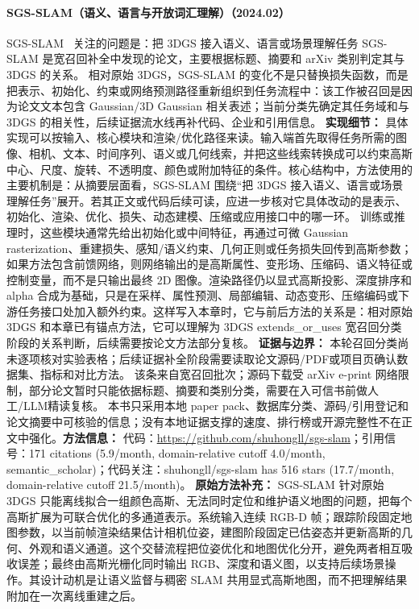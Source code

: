 \paragraph{SGS-SLAM（语义、语言与开放词汇理解）（2024.02）}
SGS-SLAM~\cite{2402_03246} 关注的问题是：把 3DGS 接入语义、语言或场景理解任务 SGS-SLAM 是宽召回补全中发现的论文，主要根据标题、摘要和 arXiv 类别判定其与 3DGS 的关系。
相对原始 3DGS，SGS-SLAM 的变化不是只替换损失函数，而是把表示、初始化、约束或网络预测路径重新组织到任务流程中：该工作被召回是因为论文文本包含 Gaussian/3D Gaussian 相关表述；当前分类先确定其任务域和与 3DGS 的相关性，后续证据流水线再补代码、企业和引用信息。
\textbf{实现细节：} 具体实现可以按输入、核心模块和渲染/优化路径来读。输入端首先取得任务所需的图像、相机、文本、时间序列、语义或几何线索，并把这些线索转换成可以约束高斯中心、尺度、旋转、不透明度、颜色或附加特征的条件。核心结构中，方法使用的主要机制是：从摘要层面看，SGS-SLAM 围绕“把 3DGS 接入语义、语言或场景理解任务”展开。若其正文或代码后续可读，应进一步核对它具体改动的是表示、初始化、渲染、优化、损失、动态建模、压缩或应用接口中的哪一环。 训练或推理时，这些模块通常先给出初始化或中间特征，再通过可微 Gaussian rasterization、重建损失、感知/语义约束、几何正则或任务损失回传到高斯参数；如果方法包含前馈网络，则网络输出的是高斯属性、变形场、压缩码、语义特征或控制变量，而不是只输出最终 2D 图像。渲染路径仍以显式高斯投影、深度排序和 alpha 合成为基础，只是在采样、属性预测、局部编辑、动态变形、压缩编码或下游任务接口处加入额外约束。这样写入本章时，它与前后方法的关系是：相对原始 3DGS 和本章已有锚点方法，它可以理解为 3DGS extends\_or\_uses 宽召回分类阶段的关系判断，后续需要按论文方法部分复核。
\textbf{证据与边界：} 本轮召回分类尚未逐项核对实验表格；后续证据补全阶段需要读取论文源码/PDF或项目页确认数据集、指标和对比方法。 该条来自宽召回批次；源码下载受 arXiv e-print 网络限制，部分论文暂时只能依据标题、摘要和类别分类，需要在入可信书前做人工/LLM精读复核。 本书只采用本地 paper pack、数据库分类、源码/引用登记和论文摘要中可核验的信息；没有本地证据支撑的速度、排行榜或开源完整性不在正文中强化。\textbf{方法信息：} 代码：\url{https://github.com/shuhongll/sgs-slam}；引用信号：171 citations (5.9/month, domain-relative cutoff 4.0/month, semantic\_scholar)；代码关注：shuhongll/sgs-slam has 516 stars (17.7/month, domain-relative cutoff 21.5/month)。
\textbf{原始方法补充：} SGS-SLAM 针对原始 3DGS 只能离线拟合一组颜色高斯、无法同时定位和维护语义地图的问题，把每个高斯扩展为可联合优化的多通道表示。系统输入连续 RGB-D 帧；跟踪阶段固定地图参数，以当前帧渲染结果估计相机位姿，建图阶段固定已估姿态并更新高斯的几何、外观和语义通道。这个交替流程把位姿优化和地图优化分开，避免两者相互吸收误差；最终由高斯光栅化同时输出 RGB、深度和语义图，以支持后续场景操作。其设计动机是让语义监督与稠密 SLAM 共用显式高斯地图，而不把理解结果附加在一次离线重建之后。
